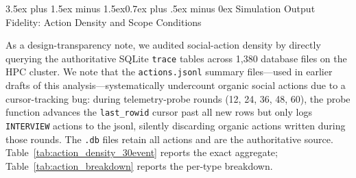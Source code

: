 \documentclass[11pt,journal,onecolumn]{IEEEtran}
\makeatletter
\renewcommand\subsection{\@startsection{subsection}{2}{\z@}%
  {3.5ex plus 1.5ex minus 1.5ex}{0.7ex plus .5ex minus 0ex}%
  {\normalfont\normalsize\bfseries}}
\makeatother
\begin{document}
\subsection{Simulation Output Fidelity: Action Density and Scope Conditions}
\label{sec:action_fidelity}

As a design-transparency note, we audited social-action density by directly querying the authoritative SQLite \texttt{trace} tables across 1,380 database files on the HPC cluster. We note that the \texttt{actions.jsonl} summary files---used in earlier drafts of this analysis---systematically undercount organic social actions due to a cursor-tracking bug: during telemetry-probe rounds (12, 24, 36, 48, 60), the probe function advances the \texttt{last\_rowid} cursor past all new rows but only logs \texttt{INTERVIEW} actions to the jsonl, silently discarding organic actions written during those rounds. The \texttt{.db} files retain all actions and are the authoritative source. Table~\ref{tab:action_density_30event} reports the exact aggregate; Table~\ref{tab:action_breakdown} reports the per-type breakdown.
\end{document}
